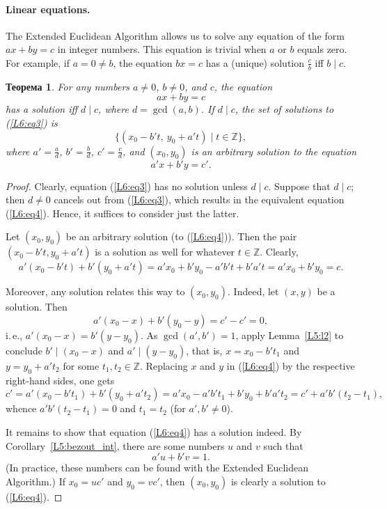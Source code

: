\documentclass[12pt,notitlepage]{article}
\theoremstyle{plain}
\newtheorem{thm}{Теорема}[section]
\theoremstyle{definition}
\theoremstyle{plain}
\newcommand{\Z}{\mathbb{Z}}
\newcommand{\1}{\mathbf{1}}
\newcommand{\0}{\mathbf{0}}
\newcommand{\dvd}{\mathop{\mid}}
\begin{document}
\paragraph{Linear equations.} The Extended Euclidean Algorithm allows us to solve any equation of the form $a x + b y = c$ in integer numbers. This equation is trivial when $a$ or $b$ equals zero. For example, if $a = 0 \neq b$, the equation $b x = c$ has a (unique) solution $\frac{c}{b}$ iff $b \dvd c$.

\begin{thm}\label{L6:t_eq} For any numbers $a \neq 0$, $b \neq 0$, and $c$, the equation
	\begin{equation}\label{L6:eq3}
		a x + b y = c
	\end{equation}
	has a solution iff $d \dvd c$, where $d = \gcd(a, b)$. If $d \dvd c$, the set of solutions to (\ref{L6:eq3}) is
	$$\{ (x_0 - b't,\ y_0 + a't) \mid t \in \Z \},$$
	where $a' = \frac{a}{d}$, $b' = \frac{b}{d}$, $c' = \frac{c}{d}$, and $(x_0, y_0)$ is an arbitrary solution to the equation
	\begin{equation}\label{L6:eq4}
		a' x + b' y = c'.
	\end{equation}
\end{thm}
\begin{proof}
	Clearly, equation (\ref{L6:eq3}) has no solution unless $d \dvd c$. Suppose that $d \dvd c$; then $d \neq 0$ cancels out from (\ref{L6:eq3}), which results in the equivalent equation (\ref{L6:eq4}). Hence, it suffices to consider just the latter.
	
	Let $(x_0, y_0)$ be an arbitrary solution (to (\ref{L6:eq4})). Then the pair $(x_0 - b't, y_0 + a't)$ is a solution as well for whatever $t \in \Z$. Clearly,
	$$a'(x_0 - b't) + b'(y_0 + a't) = a'x_0 + b'y_0 - a'b't + b'a't = a'x_0 + b'y_0 = c.$$
	
	Moreover, any solution relates this way to $(x_0, y_0)$. Indeed, let $(x, y)$ be a solution. Then
	$$a'(x_0 - x) + b'(y_0 - y) = c' - c' = 0,$$
	i.\,e., $a'(x_0 - x) = b'(y - y_0)$. As $\gcd(a', b') = 1$, apply Lemma~\ref{L5:l2} to conclude $b' \dvd (x_0 -  x)$ and $a' \dvd (y - y_0)$, that is, $x = x_0 - b't_1$ and $y = y_0 + a't_2$ for some $t_1, t_2 \in \Z$. Replacing $x$ and $y$ in (\ref{L6:eq4}) by the respective right-hand sides, one gets
	$$c' = a'(x_0 - b't_1) + b'(y_0 + a't_2)  = a'x_0 - a'b't_1 + b'y_0 + b'a't_2 = c' + a'b'(t_2 - t_1),$$
	whence $a'b'(t_2 - t_1) = 0$ and $t_1 = t_2$ (for $a', b' \neq 0$).
	
	It remains to show that equation (\ref{L6:eq4}) has a solution indeed. By Corollary~\ref{L5:bezout_int}, there are some numbers $u$ and $v$ such that
	$$a' u + b' v = 1.$$
	(In practice, these numbers can be found with the Extended Euclidean Algorithm.) If $x_0 = uc'$ and $y_0 = vc'$, then $(x_0, y_0)$ is clearly a solution to (\ref{L6:eq4}).
\end{proof}
\end{document}
